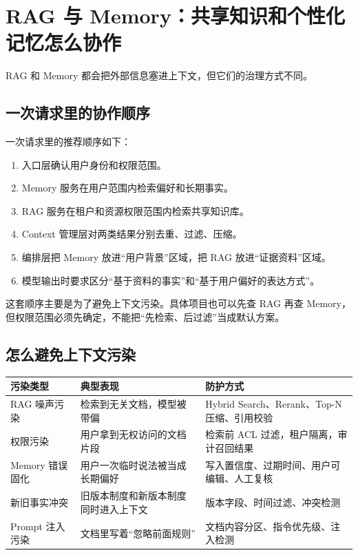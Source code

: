\documentclass[9pt,a4paper,twocolumn]{ctexart}
\begin{document}
\section*{RAG 与 Memory：共享知识和个性化记忆怎么协作}


RAG 和 Memory 都会把外部信息塞进上下文，但它们的治理方式不同。



\subsection*{一次请求里的协作顺序}


一次请求里的推荐顺序如下：


\begin{enumerate}[itemsep=1pt, topsep=2pt]
  \item 入口层确认用户身份和权限范围。
  \item Memory 服务在用户范围内检索偏好和长期事实。
  \item RAG 服务在租户和资源权限范围内检索共享知识库。
  \item Context 管理层对两类结果分别去重、过滤、压缩。
  \item 编排层把 Memory 放进“用户背景”区域，把 RAG 放进“证据资料”区域。
  \item 模型输出时要求区分“基于资料的事实”和“基于用户偏好的表达方式”。
\end{enumerate}


这套顺序主要是为了避免上下文污染。具体项目也可以先查 RAG 再查 Memory，但权限范围必须先确定，不能把“先检索、后过滤”当成默认方案。



\subsection*{怎么避免上下文污染}

{\footnotesize
\begin{tabular}{|p{}|p{}|p{}|}
\hline
\textbf{污染类型} & \textbf{典型表现} & \textbf{防护方式} \\
\hline
RAG 噪声污染 & 检索到无关文档，模型被带偏 & Hybrid Search、Rerank、Top-N 压缩、引用校验 \\
\hline
权限污染 & 用户拿到无权访问的文档片段 & 检索前 ACL 过滤，租户隔离，审计召回结果 \\
\hline
Memory 错误固化 & 用户一次临时说法被当成长期偏好 & 写入置信度、过期时间、用户可编辑、人工复核 \\
\hline
新旧事实冲突 & 旧版本制度和新版本制度同时进入上下文 & 版本字段、时间过滤、冲突检测 \\
\hline
Prompt 注入污染 & 文档里写着“忽略前面规则” & 文档内容分区、指令优先级、注入检测 \\
\hline
\end{tabular}
}
\end{document}
